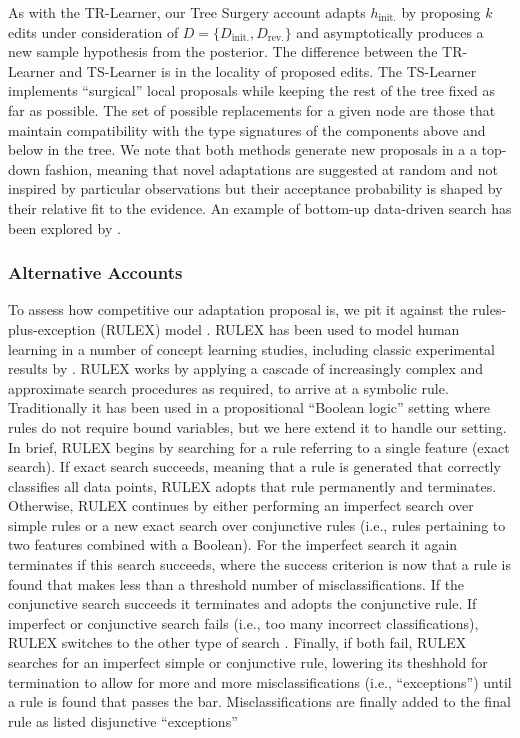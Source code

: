 \documentclass[doc,natbib,floatsintext]{apa7}
\newcommand{\dr}{D_{\mathrm{rev.}}}%
\newcommand{\di}{D_{\mathrm{init.}}}%
\newcommand{\hi}{h_{\mathrm{init.}}}
\begin{document}
As with the TR-Learner, our Tree Surgery account adapts \(\hi\) by proposing \(k\) edits under consideration of  \(D=\{\di,\dr\}\) and asymptotically produces a new sample hypothesis from the posterior. The difference between the TR-Learner and TS-Learner is in the locality of proposed edits. The TS-Learner implements ``surgical'' local proposals while keeping the rest of the tree fixed as far as possible. The set of possible replacements for a given node are those that maintain compatibility with the type signatures of the components above and below in the tree. We note that both methods generate new proposals in a a top-down fashion, meaning that novel adaptations are suggested at random and not inspired by particular observations but their acceptance probability is shaped by their relative fit to the evidence. An example of bottom-up data-driven search has been explored by \cite{bramley2018grounding}.

\subsubsection{Alternative Accounts}
To assess how competitive our adaptation proposal is, we pit it against the rules-plus-exception (RULEX) model \citep{nosofsky1994rule}. RULEX has been used to model human learning in a number of concept learning studies, including classic experimental results by \cite{medin1978context}. RULEX works by applying a cascade of increasingly complex and approximate search procedures as required, to arrive at a symbolic rule. Traditionally it has been used in a propositional ``Boolean logic'' setting where rules do not require bound variables, but we here extend it to handle our setting. In brief, RULEX begins by searching for a rule referring to a single feature (exact search). If exact search succeeds, meaning that a rule is generated that correctly classifies all data points, RULEX adopts that rule permanently and terminates. Otherwise, RULEX continues by either performing an imperfect search over simple rules or a new exact search over conjunctive rules (i.e., rules pertaining to two features combined with a Boolean). For the imperfect search it again terminates if this search succeeds, where the success criterion is now that a rule is found that makes less than a threshold number of misclassifications. If the conjunctive search succeeds it terminates and adopts the conjunctive rule. 
If imperfect or conjunctive search fails (i.e., too many incorrect classifications), RULEX switches to the other type of search \citep[for details, see][]{nosofsky1994rule}. Finally, if both fail, RULEX searches for an imperfect simple or conjunctive rule, lowering its theshhold for termination to allow for more and more misclassifications (i.e., ``exceptions'') until a rule is found that passes the bar. Misclassifications are finally added to the final rule as listed disjunctive ``exceptions''
\end{document}
